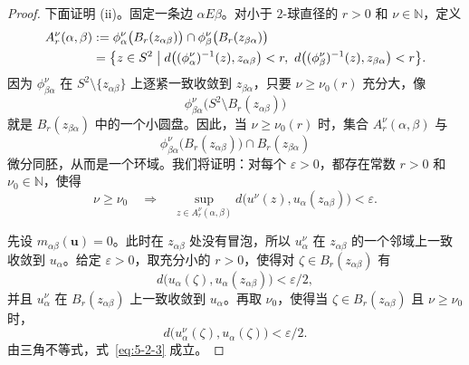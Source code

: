 \begin{proof}
下面证明 (ii)。固定一条边 $\alpha E\beta$。对小于 $2$-球直径的 $r>0$ 和
$\nu\in\mathbb N$，定义
\[
  \begin{aligned}
  A_r^\nu(\alpha,\beta)
  &:=\phi_\alpha^\nu\bigl(B_r(z_{\alpha\beta})\bigr)
    \cap\phi_\beta^\nu\bigl(B_r(z_{\beta\alpha})\bigr)\\
  &=\bigl\{z\in S^2\bigm|
    d\bigl((\phi_\alpha^\nu)^{-1}(z),z_{\alpha\beta}\bigr)<r,\ 
    d\bigl((\phi_\beta^\nu)^{-1}(z),z_{\beta\alpha}\bigr)<r\bigr\}.
  \end{aligned}
\]
因为 $\phi_{\beta\alpha}^\nu$ 在 $S^2\setminus\{z_{\alpha\beta}\}$ 上逐紧一致收敛到
$z_{\beta\alpha}$，只要 $\nu\ge\nu_0(r)$ 充分大，像
\[
  \phi_{\beta\alpha}^\nu
  \bigl(S^2\setminus B_r(z_{\alpha\beta})\bigr)
\]
就是 $B_r(z_{\beta\alpha})$ 中的一个小圆盘。因此，当 $\nu\ge\nu_0(r)$ 时，集合
$A_r^\nu(\alpha,\beta)$ 与
\[
  \phi_{\beta\alpha}^\nu\bigl(B_r(z_{\alpha\beta})\bigr)
  \cap B_r(z_{\beta\alpha})
\]
微分同胚，从而是一个环域。我们将证明：对每个 $\varepsilon>0$，都存在常数
$r>0$ 和 $\nu_0\in\mathbb N$，使得
\begin{equation}\label{eq:5-2-3}
  \nu\ge\nu_0
  \quad\Longrightarrow\quad
  \sup_{z\in A_r^\nu(\alpha,\beta)}
  d\bigl(u^\nu(z),u_\alpha(z_{\alpha\beta})\bigr)<\varepsilon.
\end{equation}

先设 $m_{\alpha\beta}(\mathbf u)=0$。此时在 $z_{\alpha\beta}$ 处没有冒泡，所以
$u_\alpha^\nu$ 在 $z_{\alpha\beta}$ 的一个邻域上一致收敛到 $u_\alpha$。给定
$\varepsilon>0$，取充分小的 $r>0$，使得对
$\zeta\in B_r(z_{\alpha\beta})$ 有
\[
  d\bigl(u_\alpha(\zeta),u_\alpha(z_{\alpha\beta})\bigr)<\varepsilon/2,
\]
并且 $u_\alpha^\nu$ 在 $B_r(z_{\alpha\beta})$ 上一致收敛到 $u_\alpha$。再取
$\nu_0$，使得当 $\zeta\in B_r(z_{\alpha\beta})$ 且 $\nu\ge\nu_0$ 时，
\[
  d\bigl(u_\alpha^\nu(\zeta),u_\alpha(\zeta)\bigr)<\varepsilon/2.
\]
由三角不等式，式~\eqref{eq:5-2-3} 成立。


\end{proof}
